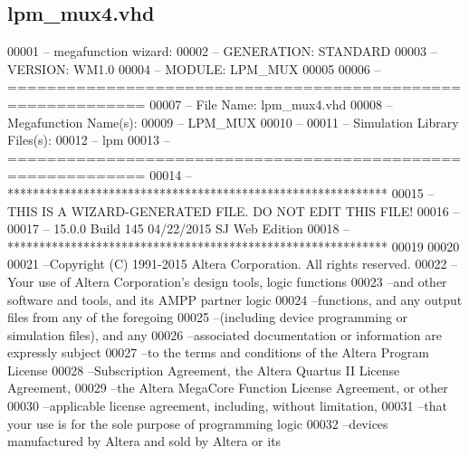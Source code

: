 \subsection{lpm\+\_\+mux4.\+vhd}
\label{lpm__mux4_8vhd_source}

\begin{DoxyCode}
00001 \textcolor{keyword}{-- megafunction wizard: %
00002 \textcolor{keyword}{-- GENERATION: STANDARD}
00003 \textcolor{keyword}{-- VERSION: WM1.0}
00004 \textcolor{keyword}{-- MODULE: LPM\_MUX }
00005 
00006 \textcolor{keyword}{-- ============================================================}
00007 \textcolor{keyword}{-- File Name: lpm\_mux4.vhd}
00008 \textcolor{keyword}{-- Megafunction Name(s):}
00009 \textcolor{keyword}{--          LPM\_MUX}
00010 \textcolor{keyword}{--}
00011 \textcolor{keyword}{-- Simulation Library Files(s):}
00012 \textcolor{keyword}{--          lpm}
00013 \textcolor{keyword}{-- ============================================================}
00014 \textcolor{keyword}{-- ************************************************************}
00015 \textcolor{keyword}{-- THIS IS A WIZARD-GENERATED FILE. DO NOT EDIT THIS FILE!}
00016 \textcolor{keyword}{--}
00017 \textcolor{keyword}{-- 15.0.0 Build 145 04/22/2015 SJ Web Edition}
00018 \textcolor{keyword}{-- ************************************************************}
00019 
00020 
00021 \textcolor{keyword}{--Copyright (C) 1991-2015 Altera Corporation. All rights reserved.}
00022 \textcolor{keyword}{--Your use of Altera Corporation's design tools, logic functions }
00023 \textcolor{keyword}{--and other software and tools, and its AMPP partner logic }
00024 \textcolor{keyword}{--functions, and any output files from any of the foregoing }
00025 \textcolor{keyword}{--(including device programming or simulation files), and any }
00026 \textcolor{keyword}{--associated documentation or information are expressly subject }
00027 \textcolor{keyword}{--to the terms and conditions of the Altera Program License }
00028 \textcolor{keyword}{--Subscription Agreement, the Altera Quartus II License Agreement,}
00029 \textcolor{keyword}{--the Altera MegaCore Function License Agreement, or other }
00030 \textcolor{keyword}{--applicable license agreement, including, without limitation, }
00031 \textcolor{keyword}{--that your use is for the sole purpose of programming logic }
00032 \textcolor{keyword}{--devices manufactured by Altera and sold by Altera or its }
}
\end{DoxyCode}
